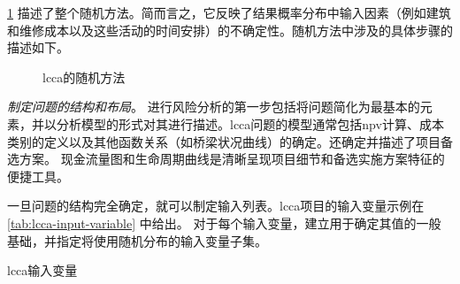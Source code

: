 \cref{fig:stochastic-approach-lcca} 描述了整个随机方法。简而言之，它反映了结果概率分布中输入因素（例如建筑和维修成本以及这些活动的时间安排）的不确定性。随机方法中涉及的具体步骤的描述如下。

\begin{figure}
  \caption{\acrlong*{lcca}的随机方法}
  \label{fig:stochastic-approach-lcca}
\end{figure}

\emph{制定问题的结构和布局}。 进行风险分析的第一步包括将问题简化为最基本的元素，并以分析模型的形式对其进行描述。\acrlong*{lcca}问题的模型通常包括\acrlong*{npv}计算、成本类别的定义以及其他函数关系（如桥梁状况曲线）的确定。还确定并描述了项目备选方案。 现金流量图和生命周期曲线是清晰呈现项目细节和备选实施方案特征的便捷工具。

一旦问题的结构完全确定，就可以制定输入列表。\acrlong*{lcca}项目的输入变量示例在 \cref{tab:lcca-input-variable} 中给出。 对于每个输入变量，建立用于确定其值的一般基础，并指定将使用随机分布的输入变量子集。

\begin{table}
  \caption{\acrlong*{lcca}输入变量}
  \label{tab:lcca-input-variable}
\end{table}

